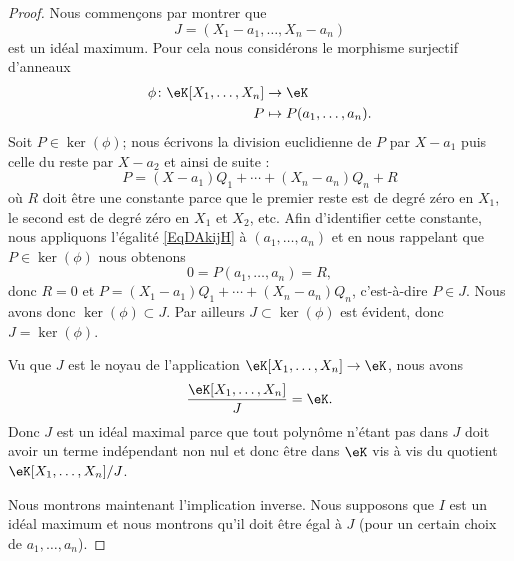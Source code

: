 \begin{proof}
	Nous commençons par montrer que
	\begin{equation}
		J=(X_1-a_1,\ldots, X_n-a_n)
	\end{equation}
	est un idéal maximum. Pour cela nous considérons le morphisme surjectif d'anneaux
	\begin{equation}
		\begin{aligned}
			\phi\colon \eK[X_1,\ldots, X_n] & \to \eK                     \\
			P                               & \mapsto P(a_1,\ldots, a_n).
		\end{aligned}
	\end{equation}
	Soit \( P\in\ker(\phi)\); nous écrivons la division euclidienne de \( P\) par \( X-a_1\) puis celle du reste par \( X-a_2\) et ainsi de suite :
	\begin{equation}    \label{EqDAkijH}
		P=(X-a_1)Q_1+\cdots +(X_n-a_n)Q_n+R
	\end{equation}
	où \( R\) doit être une constante parce que le premier reste est de degré zéro en \( X_1\), le second est de degré zéro en \( X_1\) et \( X_2\), etc. Afin d'identifier cette constante, nous appliquons l'égalité \eqref{EqDAkijH} à \( (a_1,\ldots, a_n)\) et en nous rappelant que \( P\in \ker(\phi)\) nous obtenons
	\begin{equation}
		0=P(a_1,\ldots, a_n)=R,
	\end{equation}
	donc \( R=0\) et \( P=(X_1-a_1)Q_1+\cdots +(X_n-a_n)Q_n\), c'est-à-dire \( P\in J\). Nous avons donc \( \ker(\phi)\subset J\). Par ailleurs \( J\subset \ker(\phi)\) est évident, donc \( J=\ker(\phi)\).

	Vu que \( J\) est le noyau de l'application \( \eK[X_1,\ldots, X_n]\to \eK\), nous avons
	\begin{equation}
		\frac{ \eK[X_1,\ldots, X_n] }{ J }=\eK.
	\end{equation}
	Donc \( J\) est un idéal maximal parce que tout polynôme n'étant pas dans \( J\) doit avoir un terme indépendant non nul et donc être dans \( \eK\) vis à vis du quotient \( \eK[X_1,\ldots, X_n]/J\).

	Nous montrons maintenant l'implication inverse. Nous supposons que \( I\) est un idéal maximum et nous montrons qu'il doit être égal à \( J\) (pour un certain choix de \( a_1,\ldots, a_n\)).


\end{proof}
